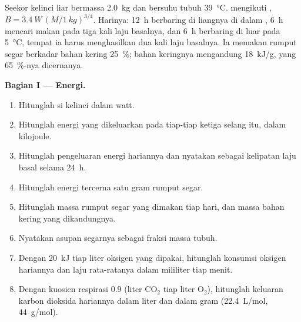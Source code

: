 \begin{problem}
\label{pb:b1:mammal-organization:1}
Seekor kelinci liar bermassa \qty{2.0}{kg} dan bersuhu tubuh
\qty{39}{\celsius}.  mengikuti ,
$B = \qty{3.4}{W}\,(M/\qty{1}{kg})^{3/4}$. Harinya: \qty{12}{h}
berbaring di liangnya di dalam , \qty{6}{h} mencari
makan pada tiga kali laju basalnya, dan \qty{6}{h} berbaring di luar
pada \qty{5}{\celsius}, tempat ia harus menghasilkan dua kali laju
basalnya. Ia memakan rumput segar berkadar bahan kering \qty{25}{\%};
bahan keringnya mengandung \qty{18}{kJ/g}, yang \qty{65}{\%}-nya
dicernanya.

\medskip
\noindent\textbf{Bagian I --- Energi.}
\begin{enumerate}
  \item Hitunglah  si kelinci dalam watt.
  \item Hitunglah energi yang dikeluarkan pada tiap-tiap ketiga selang
        itu, dalam kilojoule.
  \item Hitunglah pengeluaran energi hariannya dan nyatakan sebagai
        kelipatan laju basal selama \qty{24}{h}.
  \item Hitunglah energi tercerna satu gram rumput segar.
  \item Hitunglah massa rumput segar yang dimakan tiap hari, dan massa
        bahan kering yang dikandungnya.
  \item Nyatakan asupan segarnya sebagai fraksi massa tubuh.
  \item Dengan \qty{20}{kJ} tiap liter oksigen yang dipakai, hitunglah
        konsumsi oksigen hariannya dan laju rata-ratanya dalam
        mililiter tiap menit.
  \item Dengan kuosien respirasi $0.9$ (liter $\mathrm{CO_2}$ tiap liter
        $\mathrm{O_2}$), hitunglah keluaran karbon dioksida hariannya
        dalam liter dan dalam gram (\qty{22.4}{L/mol},
        \qty{44}{g/mol}).
\end{enumerate}


\end{problem}
